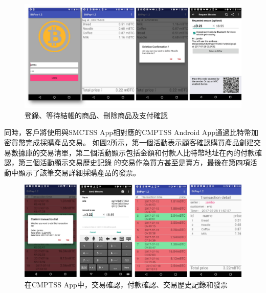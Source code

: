 \begin{figure}[!htbp]
	\centering
	\includegraphics[width = 1\textwidth]{fig7.png}
	\caption{登錄、等待結帳的商品、刪除商品及支付確認}\label{fig7}
\end{figure}

同時，客戶將使用與SMCTSS App相對應的CMPTSS Android App通過比特幣加密貨幣完成採購產品交易。 如圖\ref{fig8}所示，第一個活動表示顧客確認購買產品創建交易數據庫的交易清單，第二個活動顯示包括金額和付款人比特幣地址在內的付款確認，第三個活動顯示交易歷史記錄 的交易作為買方甚至是賣方，最後在第四項活動中顯示了該筆交易詳細採購產品的發票。    

\begin{figure}[!htbp]
	\centering
	\includegraphics[width = 1\textwidth]{fig8.png}
	\caption{在CMPTSS App中，交易確認，付款確認、交易歷史記錄和發票}\label{fig8}
\end{figure}